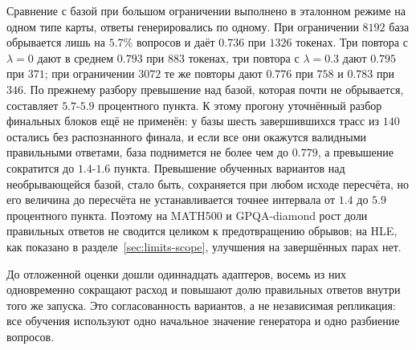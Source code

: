 \documentclass[11pt]{article}
\begin{document}
Сравнение с базой при большом ограничении выполнено в эталонном режиме на одном типе карты, ответы генерировались по одному. При ограничении $8192$ база обрывается лишь на $5.7\%$ вопросов и даёт $0.736$ при $1326$ токенах. Три повтора с $\lambda=0$ дают в среднем $0.793$ при $883$ токенах, три повтора с $\lambda=0.3$ дают $0.795$ при $371$; при ограничении $3072$ те же повторы дают $0.776$ при $758$ и $0.783$ при $346$. По прежнему разбору превышение над базой, которая почти не обрывается, составляет $5.7$-$5.9$ процентного пункта. К этому прогону уточнённый разбор финальных блоков ещё не применён: у базы шесть завершившихся трасс из $140$ остались без распознанного финала, и если все они окажутся валидными правильными ответами, база поднимется не более чем до $0.779$, а превышение сократится до $1.4$-$1.6$ пункта. Превышение обученных вариантов над необрывающейся базой, стало быть, сохраняется при любом исходе пересчёта, но его величина до пересчёта не устанавливается точнее интервала от $1.4$ до $5.9$ процентного пункта. Поэтому на MATH500 и GPQA-diamond рост доли правильных ответов не сводится целиком к предотвращению обрывов; на HLE, как показано в разделе~\ref{sec:limits-scope}, улучшения на завершённых парах нет.

До отложенной оценки дошли одиннадцать адаптеров, восемь из них одновременно сокращают расход и повышают долю правильных ответов внутри того же запуска. Это согласованность вариантов, а не независимая репликация: все обучения используют одно начальное значение генератора и одно разбиение вопросов.
\end{document}
